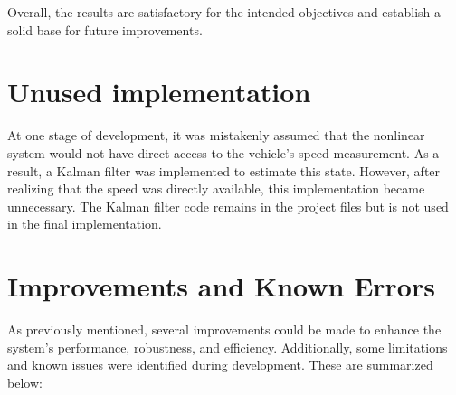 \documentclass[12pt]{article}
\begin{document}
Overall, the results are satisfactory for the intended objectives and establish a solid base for future improvements.

\section{Unused implementation}
At one stage of development, it was mistakenly assumed that the nonlinear system would not have direct access to the vehicle's 
speed measurement. As a result, a Kalman filter was implemented to estimate this state. However, after realizing that the 
speed was directly available, this implementation became unnecessary. The Kalman filter code remains in the project files 
but is not used in the final implementation.

\section{Improvements and Known Errors} \label{sec:Improvements and Known Errors}

As previously mentioned, several improvements could be made to enhance the system's performance, robustness, and efficiency. 
Additionally, some limitations and known issues were identified during development. These are summarized below:
\end{document}
